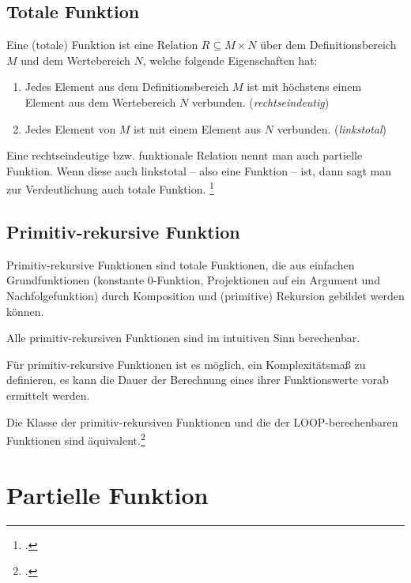 \documentclass{lehramt-informatik-haupt}
\begin{document}
\subsection{Totale Funktion}

Eine (totale) Funktion ist eine Relation $R \subseteq M \times N$ über
dem Deﬁnitionsbereich $M$ und dem Wertebereich $N$, welche folgende
Eigenschaften hat:

\begin{enumerate}
\item Jedes Element aus dem Deﬁnitionsbereich $M$ ist mit höchstens
einem Element aus dem Wertebereich $N$ verbunden. (\emph{rechtseindeutig})

\item Jedes Element von $M$ ist mit einem Element aus $N$ verbunden.
(\emph{linkstotal})
\end{enumerate}

\begin{liExkurs}
Eine rechtseindeutige bzw. funktionale Relation nennt man auch partielle
Funktion. Wenn diese auch linkstotal – also eine Funktion – ist, dann
sagt man zur Verdeutlichung auch totale Funktion.
\footcite{wiki:relation}
\end{liExkurs}

\subsection{Primitiv-rekursive Funktion}

Primitiv-rekursive Funktionen sind totale Funktionen, die aus einfachen
Grundfunktionen (konstante 0-Funktion, Projektionen auf ein Argument und
Nachfolgefunktion) durch Komposition und (primitive) Rekursion gebildet
werden können.

Alle primitiv-rekursiven Funktionen sind im intuitiven Sinn berechenbar.

Für primitiv-rekursive Funktionen ist es möglich, ein Komplexitätsmaß zu
definieren, \dh es kann die Dauer der Berechnung eines ihrer
Funktionswerte vorab ermittelt werden.

Die Klasse der primitiv-rekursiven Funktionen und die der
LOOP-berechenbaren Funktionen sind äquivalent.\footcite{wiki:primitiv-rekursive-funktion}

\section{Partielle Funktion}
\end{document}

